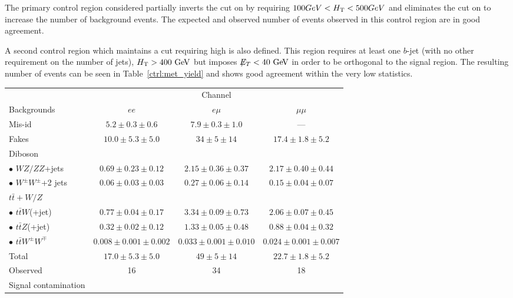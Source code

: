 The primary control region considered partially inverts the cut on \HT{} by requiring $100 GeV < H_{\mathrm{T}}{} < 500 GeV$ and eliminates the cut on \met{} to increase the number of background events.
The expected and observed number of events observed in this control region are in good agreement.

A second control region which maintains a cut requiring high \HT{} is also defined.
This region requires at least one $b$-jet (with no other requirement on the number of jets), $\HT>400 \GeV$ but imposes $\met<40 \GeV$ in order to be orthogonal to the signal region. 
The resulting number of events can be seen in Table~\ref{ctrl:met_yield} and shows good agreement within the very low statistics.


\begin{table}[p]
  \footnotesize
  \begin{center}
    \begin{tabular}{l|c|c|c}
      \hline\hline
       & \multicolumn{3}{c}{Channel} \\
      \cline{2-4}
      Backgrounds & $ee$ & $e\mu$ & $\mu\mu$ \\
      \hline
      Mis-id & $5.2\pm 0.3 \pm 0.6$ & $7.9\pm 0.3 \pm 1.0$ & --- \\
      Fakes & $10.0\pm 5.3 \pm 5.0$ & $34\pm 5 \pm 14$ & $17.4\pm 1.8 \pm 5.2$ \\
      \hline
      Diboson & & & \\
      $\bullet$ $WZ/ZZ$+jets & $0.69\pm 0.23 \pm 0.12$ & $2.15\pm 0.36\pm 0.37$ & $2.17\pm 0.40\pm 0.44$ \\
      $\bullet$ $W^{\pm}W^\pm$+2 jets & $0.06\pm 0.03\pm 0.03$ & $0.27\pm 0.06\pm 0.14$ & $0.15\pm 0.04\pm 0.07$ \\
      \hline
      $t\bar{t}+W/Z$ & & & \\
      $\bullet$ $t\bar{t}W$(+jet) & $0.77\pm 0.04\pm 0.17$ & $3.34\pm 0.09\pm 0.73$ & $2.06\pm 0.07\pm 0.45$ \\
      $\bullet$ $t\bar{t}Z$(+jet) & $0.32\pm 0.02\pm 0.12$ & $1.33\pm 0.05\pm 0.48$ & $0.88\pm 0.04\pm 0.32$ \\
      $\bullet$ $t\bar{t}W^{\pm}W^\mp$ & $0.008\pm 0.001\pm 0.002$ & $0.033\pm 0.001\pm 0.010$ & $0.024\pm 0.001\pm 0.007$ \\
      \hline
      Total & $17.0 \pm 5.3 \pm 5.0$ & $49 \pm 5 \pm 14$ & $22.7 \pm 1.8 \pm 5.2$ \\
      \hline
      Observed & 16 & 34 & 18 \\
      \hline
      Signal contamination & & & \\

\end{tabular}
\end{center}
\end{table}
